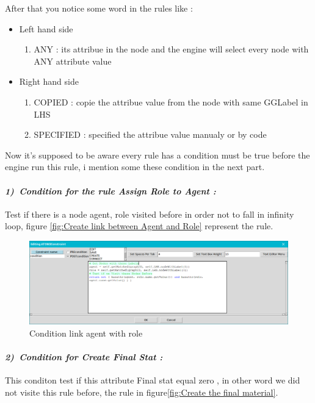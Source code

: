 After that you notice some word in the rules like  :
\begin{itemize}
\item Left hand side
	\begin{enumerate}
	\item ANY : its attribue in the node and the engine will select every node with ANY attribute value
	\end{enumerate}
\item  Right hand side
	\begin{enumerate}
	\item COPIED : copie the attribue value from the node with same GGLabel in LHS
	\item SPECIFIED : specified the attribue value manualy or by code 
	\end{enumerate}
\end{itemize}
 
Now it's supposed to be aware every rule has a condition must be true  before the engine run this rule, i mention some these condition in the next part.
\pagebreak
\paragraph{\emph{1)~Condition for the rule   Assign Role to Agent  :  } } 
 
Test if there is a node agent, role visited before 
in order not to fall in infinity loop, figure \ref{fig:Create link between Agent and Role} represent the rule.
 
\begin{figure}[th]
	\centering
 	\includegraphics[scale=0.37]{ch3/img/condrule1}
	\caption{\label{fig:Condition link agent with role}Condition link agent with role  }
\end{figure} 

\paragraph{\emph{2)~Condition for Create Final Stat : } } 
This conditon test if this attribute Final stat equal zero 
, in other word we did not visite this rule before, the rule in figure\ref{fig:Create the final material}.
 
